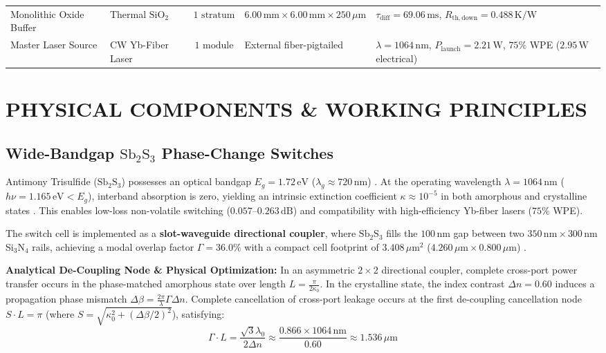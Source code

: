 \documentclass[journal]{IEEEtran}
\begin{document}
\begin{table}[!htbp]
\begin{tabularx}{\textwidth}{l l c l >{\raggedright\arraybackslash}X}
Monolithic Oxide Buffer & Thermal $\mathrm{SiO_2}$ & $1\text{ stratum}$ & $6.00\,\mathrm{mm} \times 6.00\,\mathrm{mm} \times 250\,\mu\mathrm{m}$ & $\tau_{\mathrm{diff}} = 69.06\,\mathrm{ms}$, $R_{\mathrm{th,down}} = 0.488\,\mathrm{K/W}$ \\
Master Laser Source & CW Yb-Fiber Laser & $1\text{ module}$ & External fiber-pigtailed & $\lambda = 1064\,\mathrm{nm}$, $P_{\mathrm{launch}} = 2.21\,\mathrm{W}$, $75\%$ WPE ($2.95\,\mathrm{W}$ electrical) \\
\bottomrule
\end{tabularx}
\end{table}

\section{PHYSICAL COMPONENTS \& WORKING PRINCIPLES}

\subsection{Wide-Bandgap \texorpdfstring{$\mathrm{Sb_2S_3}$}{Sb2S3} Phase-Change Switches}
Antimony Trisulfide ($\mathrm{Sb_2S_3}$) possesses an optical bandgap $E_g = 1.72\,\mathrm{eV}$ ($\lambda_g \approx 720\,\mathrm{nm}$) \cite{Dong2022}\cite{Delaney2020}. At the operating wavelength $\lambda = 1064\,\mathrm{nm}$ ($h\nu = 1.165\,\mathrm{eV} < E_g$), interband absorption is zero, yielding an intrinsic extinction coefficient $\kappa \approx 10^{-5}$ in both amorphous and crystalline states \cite{Delaney2020}\cite{Zhang2023MDM}. This enables low-loss non-volatile switching ($0.057\text{--}0.263\,\mathrm{dB}$) and compatibility with high-efficiency Yb-fiber lasers ($75\%$ WPE).

The switch cell is implemented as a \textbf{slot-waveguide directional coupler}, where $\mathrm{Sb_2S_3}$ fills the $100\,\mathrm{nm}$ gap between two $350\,\mathrm{nm} \times 300\,\mathrm{nm}$ Si$_3$N$_4$ rails, achieving a modal overlap factor $\Gamma = 36.0\%$ with a compact cell footprint of $3.408\,\mu\mathrm{m^2}$ ($4.260\,\mu\mathrm{m} \times 0.800\,\mu\mathrm{m}$) \cite{Almeida2004}\cite{Bao2025}\cite{Dong2022}.

\textbf{Analytical De-Coupling Node \& Physical Optimization:} In an asymmetric $2 \times 2$ directional coupler, complete cross-port power transfer occurs in the phase-matched amorphous state over length $L = \frac{\pi}{2 \kappa_0}$. In the crystalline state, the index contrast $\Delta n = 0.60$ induces a propagation phase mismatch $\Delta \beta = \frac{2\pi}{\lambda} \Gamma \Delta n$. Complete cancellation of cross-port leakage occurs at the first de-coupling cancellation node $S \cdot L = \pi$ (where $S = \sqrt{\kappa_0^2 + (\Delta\beta/2)^2}$), satisfying:
\begin{equation}
    \Gamma \cdot L = \frac{\sqrt{3}\lambda_0}{2\Delta n} \approx \frac{0.866 \times 1064\,\mathrm{nm}}{0.60} \approx 1.536\,\mu\mathrm{m}
\end{equation}
\end{document}
